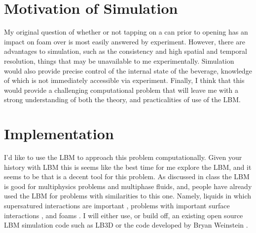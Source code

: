 \documentclass[10pt,a4paper]{article}
\begin{document}
	\section{Motivation of Simulation}
	My original question of whether or not tapping on a can prior to opening has an impact on foam over is most easily answered by experiment. However, there are advantages to simulation, such as the consistency and high spatial and temporal resolution, things that may be unavailable to me experimentally. Simulation would also provide precise control of the internal state of the beverage, knowledge of which is not immediately accessible via experiment. Finally, I think that this would provide a challenging computational problem that will leave me with a strong understanding of both the theory, and practicalities of use of the LBM. 
	\section{Implementation}
	I'd like to use the LBM to approach this problem computationally. Given your history with LBM this is seems like the best time for me explore the LBM, and it seems to be that is a decent tool for this problem. As discussed in class the LBM is good for multiphysics problems and multiphase fluids, and, people have already used the LBM for problems with similarities to this one. Namely, liquids in which supersatured interactions are important \cite{kang_lattice_2004}, problems with important surface interactions \cite{martys_simulation_1996} \cite{attar_lattice_2009}, and foams \cite{barzegari_multiphase_2017,beugre_lattice_2010}. I will either use, or build off, an existing open source LBM simulation code such as LB3D \cite{schmieschek_lb3d:_2017} or the code developed by Bryan Weinstein \cite{weinstein_2d-lb:_2016}.

	\printbibliography
\end{document}
